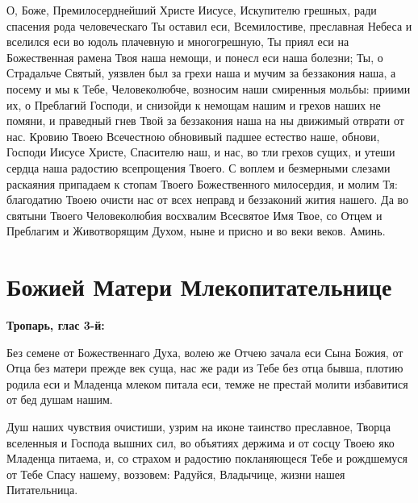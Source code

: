 О, Боже, Премилосерднейший Христе Иисусе, Искупителю грешных, ради спасения рода человеческаго Ты оставил еси, Всемилостиве, преславная Небеса и вселился еси во юдоль плачевную и многогрешную, Ты приял еси на Божественная рамена Твоя наша немощи, и понесл еси наша болезни; Ты, о Страдальче Святый, уязвлен был за грехи наша и мучим за беззакония наша, а посему и мы к Тебе, Человеколюбче, возносим наши смиренныя мольбы: приими их, о Преблагий Господи, и снизойди к немощам нашим и грехов наших не помяни, и праведный гнев Твой за беззакония наша на ны движимый отврати от нас. Кровию Твоею Всечестною обновивый падшее естество наше, обнови, Господи Иисусе Христе, Спасителю наш, и нас, во тли грехов сущих, и утеши сердца наша радостию всепрощения Твоего. С воплем и безмерными слезами раскаяния припадаем к стопам Твоего Божественного милосердия, и молим Тя: благодатию Твоею очисти нас от всех неправд и беззаконий жития нашего. Да во святыни Твоего Человеколюбия восхвалим Всесвятое Имя Твое, со Отцем и Преблагим и Животворящим Духом, ныне и присно и во веки веков. Аминь.\mychapterending


 

\section{Божией Матери Млекопитательнице}
 
\bfseries Тропарь, глас 3-й:\normalfont{}


Без семене от Божественнаго Духа, волею же Отчею зачала еси Сына Божия, от Отца без матери прежде век суща, нас же ради из Тебе без отца бывша, плотию родила еси и Младенца млеком питала еси, темже не престай молити избавитися от бед душам нашим.




Душ наших чувствия очистиши, узрим на иконе таинство преславное, Творца вселенныя и Господа вышних сил, во объятиях держима и от сосцу Твоею яко Младенца питаема, и, со страхом и радостию покланяющеся Тебе и рождшемуся от Тебе Спасу нашему, воззовем: Радуйся, Владычице, жизни нашея Питательница.




